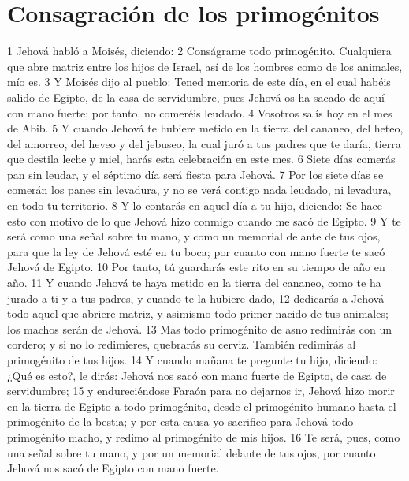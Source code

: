 \section{Consagración de los primogénitos}
1 Jehová habló a Moisés, diciendo:
2 Conságrame todo primogénito. Cualquiera que abre matriz entre los hijos de Israel, así de los hombres como de los animales, mío es.
3 Y Moisés dijo al pueblo: Tened memoria de este día, en el cual habéis salido de Egipto, de la casa de servidumbre, pues Jehová os ha sacado de aquí con mano fuerte; por tanto, no comeréis leudado.
4 Vosotros salís hoy en el mes de Abib.
5 Y cuando Jehová te hubiere metido en la tierra del cananeo, del heteo, del amorreo, del heveo y del jebuseo, la cual juró a tus padres que te daría, tierra que destila leche y miel, harás esta celebración en este mes.
6 Siete días comerás pan sin leudar, y el séptimo día será fiesta para Jehová.
7 Por los siete días se comerán los panes sin levadura, y no se verá contigo nada leudado, ni levadura, en todo tu territorio.
8 Y lo contarás en aquel día a tu hijo, diciendo: Se hace esto con motivo de lo que Jehová hizo conmigo cuando me sacó de Egipto.
9 Y te será como una señal sobre tu mano, y como un memorial delante de tus ojos, para que la ley de Jehová esté en tu boca; por cuanto con mano fuerte te sacó Jehová de Egipto.
10 Por tanto, tú guardarás este rito en su tiempo de año en año.
11 Y cuando Jehová te haya metido en la tierra del cananeo, como te ha jurado a ti y a tus padres, y cuando te la hubiere dado,
12 dedicarás a Jehová todo aquel que abriere matriz, y asimismo todo primer nacido de tus animales; los machos serán de Jehová.
13 Mas todo primogénito de asno redimirás con un cordero; y si no lo redimieres, quebrarás su cerviz. También redimirás al primogénito de tus hijos.
14 Y cuando mañana te pregunte tu hijo, diciendo: ¿Qué es esto?, le dirás: Jehová nos sacó con mano fuerte de Egipto, de casa de servidumbre;
15 y endureciéndose Faraón para no dejarnos ir, Jehová hizo morir en la tierra de Egipto a todo primogénito, desde el primogénito humano hasta el primogénito de la bestia; y por esta causa yo sacrifico para Jehová todo primogénito macho, y redimo al primogénito de mis hijos.
16 Te será, pues, como una señal sobre tu mano, y por un memorial delante de tus ojos, por cuanto Jehová nos sacó de Egipto con mano fuerte.

